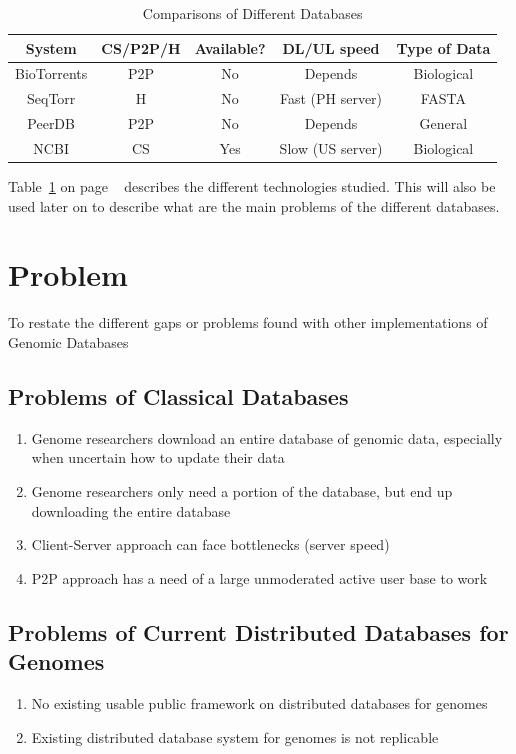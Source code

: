 \documentclass[acmsmall]{acmart}
\begin{document}
\begin{table}[h]
    \caption{Comparisons of Different Databases}
    \label{table:database_comparison_table}
    \begin{tabular}{ccccc}
    \toprule
    System      & CS/P2P/H & Available? & DL/UL speed & Type of Data \\ 
    \midrule
    BioTorrents & P2P           & No         & Depends                    & Biological  \\ 
    SeqTorr     & H             & No         & Fast (PH server)           & FASTA        \\ 
    PeerDB      & P2P           & No         & Depends                    & General      \\ 
    NCBI        & CS            & Yes        & Slow (US server)           & Biological  \\ 
    \bottomrule
    \end{tabular}
\end{table} 

Table~\ref{table:database_comparison_table} on page ~\pageref{table:database_comparison_table} describes the different technologies studied. This will also be used later on to describe what are the main problems of the different databases.

\section{Problem}
To restate the different gaps or problems found with other implementations of Genomic Databases
\subsection{Problems of Classical Databases}
\begin{enumerate}
\item Genome researchers download an entire database of genomic data, especially when uncertain how to update their data
\item Genome researchers only need a portion of the database, but end up downloading the entire database
\item Client-Server approach can face bottlenecks (server speed)
\item P2P approach has a need of a large unmoderated active user base to work

\end{enumerate}

\subsection{Problems of Current Distributed Databases for Genomes}
\begin{enumerate}
    \item No existing usable public framework on distributed databases for genomes
    \item Existing distributed database system for genomes is not replicable
\end{enumerate}
\end{document}

